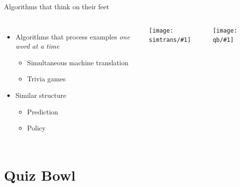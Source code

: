 \documentclass[compress]{beamer}
\newcommand{\gfxs}[2]{
\begin{center}
	\texttt{[image: simtrans/\#1]}
\end{center}
}
\newcommand{\gfxq}[2]{
\begin{center}
	\texttt{[image: qb/\#1]}
\end{center}
}
\begin{document}
\begin{frame}{Algorithms that think on their feet}

\begin{columns}

  \begin{itemize}
     \item Algorithms that process examples \emph{one word at a time}
       \begin{itemize}
         \item Simultaneous machine translation
         \item Trivia games
       \end{itemize}
      \item Similar structure
        \begin{itemize}
          \item Prediction
          \item Policy
        \end{itemize}
  \end{itemize}


  \gfxs{nuremberg_translators}{.7}
  \gfxq{quizbowl}{.7}

\end{columns}

\end{frame}

\section{Quiz Bowl}
\end{document}
